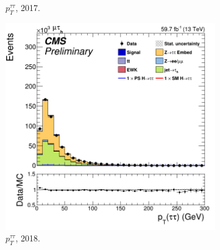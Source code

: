 \begin{figure}
\begin{subfigure}[b]{0.33\linewidth}
    \caption{$p^{\tau\tau}_T$, 2017.} 
    \vspace{0.5ex}
  \end{subfigure} 
    \begin{subfigure}[b]{0.33\linewidth}
    \centering
    \includegraphics[width=\linewidth]{Chapitre7/Images/CtrlPlots/2018/DitaupT.png} 
    \caption{$p^{\tau\tau}_T$, 2018.} 
    \vspace{0.5ex}
  \end{subfigure} 
  \caption{}
  \label{page2}
\end{figure}

